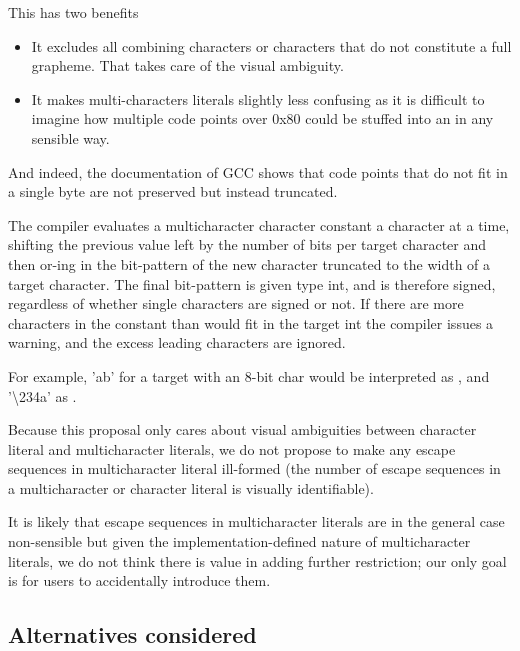 \documentclass{wg21}
\begin{document}
    This has two benefits
    \begin{itemize}
        \item It excludes all combining characters or characters that do not constitute a full grapheme. That takes care of the visual ambiguity.
        \item It makes multi-characters literals slightly less confusing as it is difficult to imagine how multiple code points over 0x80 could be stuffed into an  in any sensible way.
    \end{itemize}
    And indeed, the documentation of GCC shows that code points that do not fit in a single byte are not preserved but instead truncated.
    \begin{quoteblock}
        The compiler evaluates a multicharacter character constant a character at a time, shifting the previous value left by the number of bits per target character and then or-ing in the bit-pattern of the new character truncated to the width of a target character. The final bit-pattern is given type int, and is therefore signed, regardless of whether single characters are signed or not. If there are more characters in the constant than would fit in the target int the compiler issues a warning, and the excess leading characters are ignored.

        For example, 'ab' for a target with an 8-bit char would be interpreted as , and '\textbackslash 234a' as .
    \end{quoteblock}

    Because this proposal only cares about visual ambiguities between character literal and multicharacter literals, we do not propose to
    make any escape sequences in multicharacter literal ill-formed (the number of escape sequences in a multicharacter or character literal is visually identifiable).

    It is likely that escape sequences in multicharacter literals are in the general case non-sensible but given the implementation-defined nature of
    multicharacter literals, we do not think there is value in adding further restriction; our only goal is for users to accidentally introduce them.

    \subsection{Alternatives considered}
\end{document}

